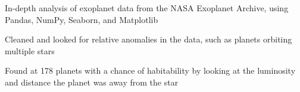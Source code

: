 \documentclass[]{resume-template}
\begin{document}
\begin{minipage}[t]{0.66\textwidth}

        \label{subsec:exo-eda}
        \begin{tightemize}
            \item In-depth analysis of exoplanet data from the NASA Exoplanet Archive, using Pandas, NumPy,
            Seaborn, and Matplotlib
            \item Cleaned and looked for relative anomalies in the data, such as planets orbiting multiple stars
            \item Found at 178 planets with a chance of habitability by looking at the luminosity and distance the planet was away from the star

        \end{tightemize}
        \vspace{\topsep}


\end{minipage}
\end{document}
